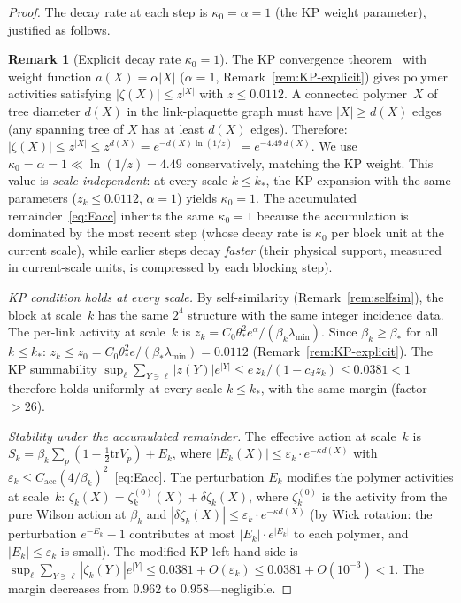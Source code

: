 \documentclass[11pt]{article}
\theoremstyle{definition}
\newtheorem{remark}[theorem]{Remark}
\newcommand{\tr}{\mathrm{tr}}
\begin{document}
\begin{proof}
The decay rate at each step is
$\kappa_0=\alpha=1$ (the KP weight parameter), justified as follows.

\begin{remark}[Explicit decay rate $\kappa_0=1$]%
\label{rem:kappa-value}
The KP convergence theorem~\cite{KP} with weight function
$a(X)=\alpha|X|$ ($\alpha=1$, Remark~\ref{rem:KP-explicit})
gives polymer activities satisfying $|\zeta(X)|\le z^{|X|}$
with $z\le 0.0112$.  A connected polymer~$X$ of tree diameter
$d(X)$ in the link-plaquette graph must have $|X|\ge d(X)$
edges (any spanning tree of $X$ has at least $d(X)$ edges).
Therefore:
$|\zeta(X)|\le z^{|X|}\le z^{d(X)}=e^{-d(X)\ln(1/z)}$
$=e^{-4.49\,d(X)}$.
We use $\kappa_0=\alpha=1\ll\ln(1/z)=4.49$ conservatively,
matching the KP weight.  This value is
\emph{scale-independent}: at every scale $k\le k_*$, the
KP expansion with the same parameters ($z_k\le 0.0112$,
$\alpha=1$) yields $\kappa_0=1$.
The accumulated remainder~\eqref{eq:Eacc} inherits the same
$\kappa_0=1$ because the accumulation is dominated by the
most recent step (whose decay rate is $\kappa_0$ per block
unit at the current scale), while earlier steps decay
\emph{faster} (their physical support, measured in current-scale
units, is compressed by each blocking step).
\end{remark}

\emph{KP condition holds at every scale.}
By self-similarity (Remark~\ref{rem:selfsim}), the block at
scale~$k$ has the same $2^4$ structure with the same integer
incidence data.  The per-link activity at scale~$k$ is
$z_k=C_0\theta_*^2 e^\alpha/(\beta_k\lambda_{\min})$.  Since
$\beta_k\ge\beta_*$ for all $k\le k_*$:
$z_k\le z_0=C_0\theta_*^2 e/(\beta_*\lambda_{\min})=0.0112$
(Remark~\ref{rem:KP-explicit}).  The KP summability
$\sup_\ell\sum_{Y\ni\ell}|z(Y)|e^{|Y|}
\le e\,z_k/(1-c_d z_k)\le 0.0381<1$
therefore holds uniformly at every scale $k\le k_*$, with the
same margin (factor $>26$).

\emph{Stability under the accumulated remainder.}
The effective action at scale~$k$ is
$S_k=\beta_k\sum_p(1-\frac{1}{2}\tr V_p)+E_k$, where
$|E_k(X)|\le\varepsilon_k\cdot e^{-\kappa d(X)}$ with
$\varepsilon_k\le C_{\mathrm{acc}}(4/\beta_k)^2$~\eqref{eq:Eacc}.
The perturbation $E_k$ modifies the polymer activities at scale~$k$:
$\zeta_k(X)=\zeta_k^{(0)}(X)+\delta\zeta_k(X)$, where
$\zeta_k^{(0)}$ is the activity from the pure Wilson action at
$\beta_k$ and $|\delta\zeta_k(X)|
\le\varepsilon_k\cdot e^{-\kappa d(X)}$ (by Wick rotation:
the perturbation $e^{-E_k}-1$ contributes at most
$|E_k|\cdot e^{|E_k|}$ to each polymer, and $|E_k|\le\varepsilon_k$
is small).  The modified KP left-hand side is
$\sup_\ell\sum_{Y\ni\ell}|\zeta_k(Y)|e^{|Y|}
\le 0.0381+O(\varepsilon_k)\le 0.0381+O(10^{-3})<1$.
The margin decreases from $0.962$ to $0.958$---negligible.


\end{proof}
\end{document}
